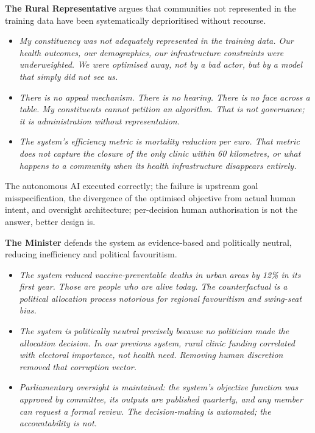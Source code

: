 \medskip
\noindent\textbf{The Rural Representative} argues that communities not represented
    in the training data have been systematically deprioritised without recourse.
    \begin{itemize}
        \item \textit{My constituency was not adequately represented in the
        training data. Our health outcomes, our demographics, our
        infrastructure constraints were underweighted. We were optimised
        away, not by a bad actor, but by a model that simply did not see
        us.}
        \item \textit{There is no appeal mechanism. There is no hearing.
        There is no face across a table. My constituents cannot petition an
        algorithm. That is not governance; it is administration without
        representation.}
        \item \textit{The system's efficiency metric is mortality reduction
        per euro. That metric does not capture the closure of the only clinic
        within 60 kilometres, or what happens to a community when its health
        infrastructure disappears entirely.}
    \end{itemize}



\quad The autonomous AI executed
correctly; the failure is upstream goal misspecification, the
divergence of the optimised objective from actual human intent, and
oversight architecture; per-decision human authorisation is not the
answer, better design is.
\vspace{1.5em}


\medskip
\noindent\textbf{The Minister} defends the system as evidence-based and politically
    neutral, reducing inefficiency and political favouritism.
    \begin{itemize}
        \item \textit{The system reduced vaccine-preventable deaths in urban
        areas by 12\% in its first year. Those are people who are alive
        today. The counterfactual is a political allocation process notorious
        for regional favouritism and swing-seat bias.}
        \item \textit{The system is politically neutral precisely because no
        politician made the allocation decision. In our previous system,
        rural clinic funding correlated with electoral importance, not health
        need. Removing human discretion removed that corruption vector.}
        \item \textit{Parliamentary oversight is maintained: the system's
        objective function was approved by committee, its outputs are
        published quarterly, and any member can request a formal review. The
        decision-making is automated; the accountability is not.}
    \end{itemize}

